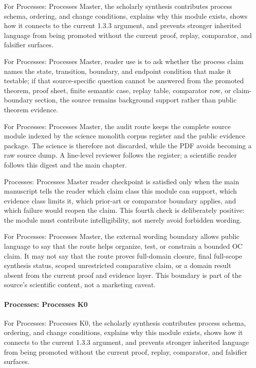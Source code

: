 For Processes: Processes Master, the scholarly synthesis contributes process schema, ordering, and change conditions, explains why this module exists, shows how it connects to the current 1.3.3 argument, and prevents stronger inherited language from being promoted without the current proof, replay, comparator, and falsifier surfaces.


For Processes: Processes Master, reader use is to ask whether the process claim names the state, transition, boundary, and endpoint condition that make it testable; if that source-specific question cannot be answered from the promoted theorem, proof sheet, finite semantic case, replay table, comparator row, or claim-boundary section, the source remains background support rather than public theorem evidence.


For Processes: Processes Master, the audit route keeps the complete source module indexed by the science monolith corpus register and the public evidence package. The science is therefore not discarded, while the PDF avoids becoming a raw source dump. A line-level reviewer follows the register; a scientific reader follows this digest and the main chapter.


Processes: Processes Master reader checkpoint is satisfied only when the main manuscript tells the reader which claim class this module can support, which evidence class limits it, which prior-art or comparator boundary applies, and which failure would reopen the claim. This fourth check is deliberately positive: the module must contribute intelligibility, not merely avoid forbidden wording.


For Processes: Processes Master, the external wording boundary allows public language to say that the route helps organize, test, or constrain a bounded OC claim. It may not say that the route proves full-domain closure, final full-scope synthesis status, scoped unrestricted comparative claim, or a domain result absent from the current proof and evidence layer. This boundary is part of the source's scientific content, not a marketing caveat.


\paragraph{Processes: Processes K0}

For Processes: Processes K0, the scholarly synthesis contributes process schema, ordering, and change conditions, explains why this module exists, shows how it connects to the current 1.3.3 argument, and prevents stronger inherited language from being promoted without the current proof, replay, comparator, and falsifier surfaces.


